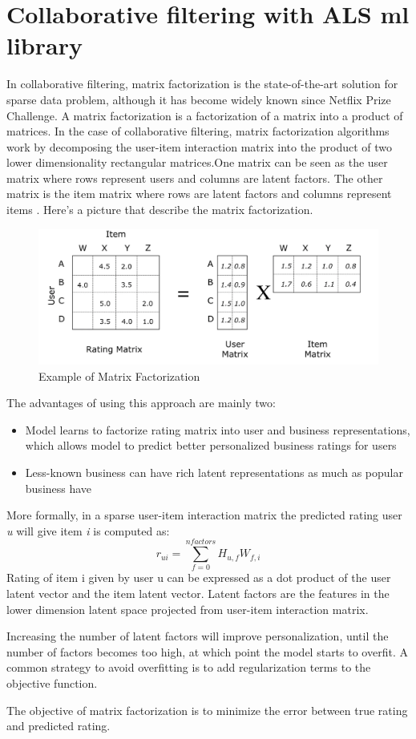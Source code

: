 \documentclass[12pt,english]{report}
\begin{document}
\section{Collaborative filtering with ALS ml library}
In collaborative filtering, matrix factorization is the state-of-the-art solution for sparse data problem, although it has become widely known since Netflix Prize Challenge.
A matrix factorization is a factorization of a matrix into a product of matrices. 
In the case of collaborative filtering, matrix factorization algorithms work by decomposing the user-item interaction matrix into the product of two lower dimensionality rectangular matrices.One matrix can be seen as the user matrix where rows represent users and columns are latent factors. The other matrix is the item matrix where rows are latent factors and columns represent items \cite{matrixfact}. Here's a picture that describe the matrix factorization.
\begin{figure}[hbtp]
\caption{Example of Matrix Factorization}
\centering
\includegraphics[scale=0.6]{../Images/matrixfact.png}
\end{figure}
The advantages of using this approach are mainly two:
\begin{itemize}
\item Model learns to factorize rating matrix into user and business representations, which allows model to predict better personalized business ratings for users
\item Less-known business can have rich latent representations as much as popular business have
\end{itemize}
More formally, in a sparse user-item interaction matrix the predicted rating user \textit{u} will give item \textit{i} is computed as:
$$r_{ui} = \sum_{f=0}^{nfactors} H_{u,f}W_{f,i}$$
Rating of item i given by user u can be expressed as a dot product of the user latent vector and the item latent vector.  Latent factors are the features in the lower dimension latent space projected from user-item interaction matrix.\par
Increasing the number of latent factors will improve personalization, until the number of factors becomes too high, at which point the model starts to overfit. A common strategy to avoid overfitting is to add regularization terms to the objective function.\par
The objective of matrix factorization is to minimize the error between true rating and predicted rating.
\end{document}

